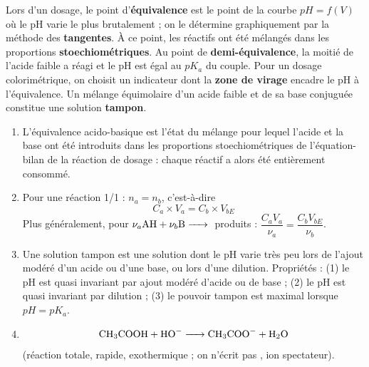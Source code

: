 \documentclass[11pt]{article}
\newcommand{\cle}[1]{{\popxbold\color{popdark}#1}}
\begin{document}
\begin{corrige}
Lors d'un dosage, le point d'\textbf{équivalence} est le point de la courbe $pH = f(V)$ où le pH varie le plus brutalement ; on le détermine graphiquement par la méthode des \textbf{tangentes}. À ce point, les réactifs ont été mélangés dans les proportions \textbf{stoechiométriques}. Au point de \textbf{demi-équivalence}, la moitié de l'acide faible a réagi et le pH est égal au \textbf{$pK_a$} du couple. Pour un dosage colorimétrique, on choisit un indicateur dont la \textbf{zone de virage} encadre le pH à l'équivalence. Un mélange équimolaire d'un acide faible et de sa base conjuguée constitue une solution \textbf{tampon}.
\end{corrige}

\begin{corrige}
\begin{enumerate}
\item L'\cle{équivalence acido-basique} est l'état du mélange pour lequel l'acide et la base ont été introduits dans les proportions stoechiométriques de l'équation-bilan de la réaction de dosage : chaque réactif a alors été entièrement consommé.
\item Pour une réaction 1/1 : $n_a = n_b$, c'est-à-dire
\[ C_a \times V_a = C_b \times V_{bE} \]
Plus généralement, pour $\nu_a \ce{AH} + \nu_b \ce{B} \ce{->}$ produits : $\dfrac{C_a V_a}{\nu_a} = \dfrac{C_b V_{bE}}{\nu_b}$.
\item Une \cle{solution tampon} est une solution dont le pH varie très peu lors de l'ajout modéré d'un acide ou d'une base, ou lors d'une dilution. Propriétés : (1) le pH est quasi invariant par ajout modéré d'acide ou de base ; (2) le pH est quasi invariant par dilution ; (3) le pouvoir tampon est maximal lorsque $pH = pK_a$.
\item \[ \ce{CH3COOH + HO- -> CH3COO- + H2O} \]
(réaction totale, rapide, exothermique ; on n'écrit pas , ion spectateur).
\end{enumerate}
\end{corrige}
\end{document}
